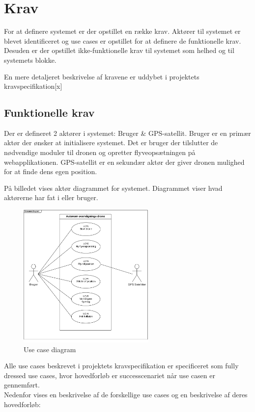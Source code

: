 \section{Krav}

For at definere systemet er der opstillet en række krav. Aktører til systemet er blevet identificeret og use cases er opstillet for at definere de funktionelle krav. Desuden er der opstillet ikke-funktionelle krav til systemet som helhed og til systemets blokke.\newline

En mere detaljeret beskrivelse af kravene er uddybet i projektets kravspecifikation[x]

\subsection{Funktionelle krav}
Der er defineret 2 aktører i systemet: Bruger \& GPS-satellit.
Bruger er en primær aktør der ønsker at initialisere systemet. Det er bruger der tilslutter de nødvendige moduler til dronen og opretter flyveopsætningen på webapplikationen.
GPS-satellit er en sekundær aktør der giver dronen mulighed for at finde dens egen position. 

På billedet vises aktør diagrammet for systemet. Diagrammet viser hvad aktørerne har fat i eller bruger.
\begin{figure}[H]
	\centering
	\includegraphics[width=0.60\textwidth]{Billeder/Krav/Use_case_diagram}
	\caption{Use case diagram}
	\label{fig:useCaseDiagram}
\end{figure}

Alle use cases beskrevet i projektets kravspecifikation er specificeret som fully dressed use cases, hvor hovedforløb er successcenariet når use casen er gennemført. \\
Nedenfor vises en beskrivelse af de forskellige use cases og en beskrivelse af deres hovedforløb:

